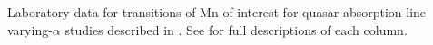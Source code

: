 Laboratory data for transitions of Mn of interest for quasar absorption-line varying-$\alpha$ studies described in . See  for full descriptions of each column.
